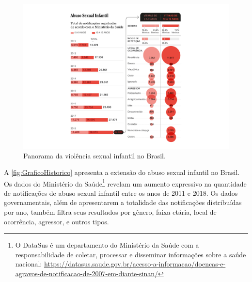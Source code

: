 
\begin{figure}[htb]
	\caption{\label{fig:GraficoHistorico}Panorama da violência sexual infantil no Brasil.}
    \hspace{-5.0 cm}
    \includegraphics[width=1.6\linewidth]{./Figuras/GraficoHistorico.pdf}
  \vspace{-1.0cm}
\end{figure}



A \autoref{fig:GraficoHistorico} apresenta a extensão do abuso sexual infantil no Brasil. Os dados do Ministério da Saúde\footnote{O DataSus é um departamento do Ministério da Saúde com a responsabilidade de coletar, processar e disseminar informações sobre a saúde nacional: \url{https://datasus.saude.gov.br/acesso-a-informacao/doencas-e-agravos-de-notificacao-de-2007-em-diante-sinan/}} revelam um aumento expressivo na quantidade de notificações de abuso sexual infantil entre os anos de 2011 e 2018. Os dados governamentais, além de apresentarem a totalidade das notificações distribuídas por ano, também filtra seus resultados por gênero, faixa etária, local de ocorrência, agressor, e outros tipos. 

